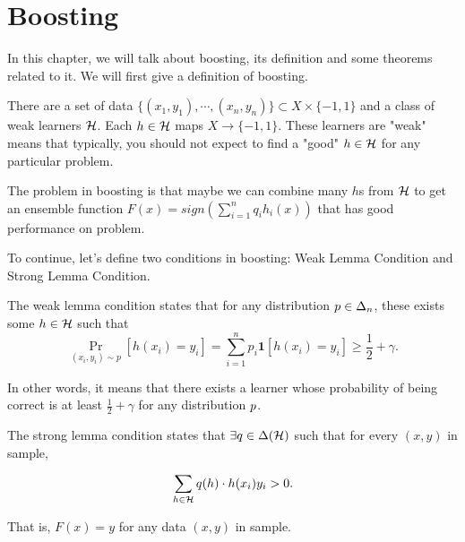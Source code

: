 \documentclass[main.tex]{subfiles}
\begin{document}
\chapter{Boosting}
In this chapter, we will talk about boosting, its definition and some theorems related to it. We will first give a definition of boosting.

\begin{definition}
	There are a set of data $\{(x_1, y_1),\cdots, (x_n, y_n) \} \subset X \times \{-1,1\}$ and a class of weak learners $\mathcal{H}$. Each $h \in \mathcal{H}$ maps $X \to \{-1,1\}$. These learners are "weak" means that typically, you should not expect to find a "good" $h\in \mathcal{H}$ for any particular problem.
	
	The problem in boosting is that maybe we can combine many $h$s from $\mathcal{H}$ to get an ensemble function $F(x) = sign(\sum\limits_{i=1}^n q_ih_i(x))$ that has good performance on problem.
\end{definition}

To continue, let's define two conditions in boosting: Weak Lemma Condition and Strong Lemma Condition.

\begin{definition}
The weak lemma condition states that for any distribution $p \in \Delta_n$, these exists some $h \in \mathcal{H}$ such that 
\begin{equation}
\Pr\limits_{(x_i,y_i) \sim p} [h(x_i) = y_i] = \sum\limits_{i=1}^n p_i \mathbf{1} [h(x_i) = y_i] \geq \frac{1}{2} + \gamma.
\end{equation}

\end{definition}

In other words, it means that there exists a learner whose probability of being correct is at least $\frac{1}{2} + \gamma$ for any distribution $p$.

\begin{definition}
The strong lemma condition states that $\exists q \in \Delta (\mathcal{H})$ such that for every $(x,y)$ in sample, 

\begin{equation}
\sum\limits_{h\in \mathcal{H}} q(h) \cdot h(x_i)y_i > 0.
\end{equation}

That is, $F(x) = y$ for any data $(x,y)$ in sample.


\end{definition}
\end{document}

